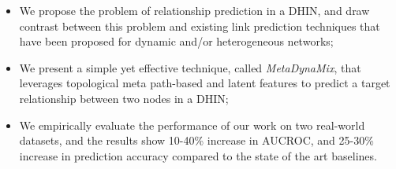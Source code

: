 \begin{itemize}

\item We propose the problem of relationship prediction in a DHIN, and draw contrast between this problem and existing link prediction techniques that have been proposed for dynamic and/or heterogeneous networks;

\item We present a simple yet effective technique, called \textit{MetaDynaMix}, that leverages topological meta path-based and latent features to predict a target relationship between two nodes in a DHIN;



\item We empirically evaluate the performance of our work on two real-world datasets, and the results show 10-40\% increase in AUCROC, and 25-30\% increase in prediction accuracy compared to the state of the art baselines.

\end{itemize}



